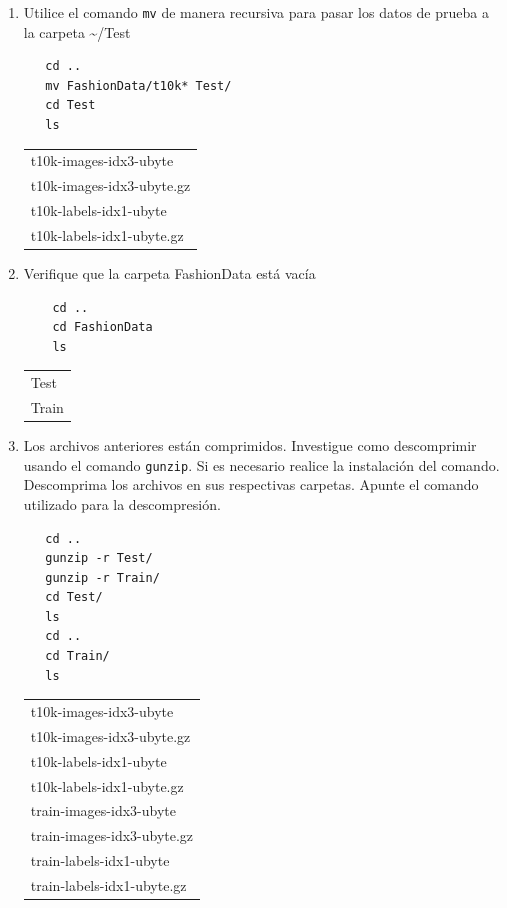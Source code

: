 \documentclass{article}
\begin{document}
\begin{enumerate}
\item Utilice el comando \texttt{mv} de manera recursiva para pasar los datos de
prueba a la carpeta \textasciitilde{}/Test
\begin{verbatim}
   cd ..
   mv FashionData/t10k* Test/
   cd Test
   ls

\end{verbatim}

\begin{table}[htbp]
\label{tab:orgbd0b6e0}
\centering
\begin{tabular}{l}
t10k-images-idx3-ubyte\\
t10k-images-idx3-ubyte.gz\\
t10k-labels-idx1-ubyte\\
t10k-labels-idx1-ubyte.gz\\
\end{tabular}
\end{table}

\item Verifique que la carpeta FashionData está vacía
\begin{verbatim}
    cd ..
    cd FashionData
    ls 
\end{verbatim}

\begin{table}[htbp]
\label{tab:org85ac1be}
\centering
\begin{tabular}{l}
Test\\
Train\\
\end{tabular}
\end{table}

\item Los archivos anteriores están comprimidos. Investigue como
descomprimir usando el comando \texttt{gunzip}. Si es necesario realice la
instalación del comando. Descomprima los archivos en sus
respectivas carpetas. Apunte el comando utilizado para la descompresión.
\begin{verbatim}
   cd ..
   gunzip -r Test/
   gunzip -r Train/
   cd Test/
   ls
   cd ..
   cd Train/
   ls

\end{verbatim}

\begin{table}[htbp]
\label{tab:org1d18902}
\centering
\begin{tabular}{l}
t10k-images-idx3-ubyte\\
t10k-images-idx3-ubyte.gz\\
t10k-labels-idx1-ubyte\\
t10k-labels-idx1-ubyte.gz\\
train-images-idx3-ubyte\\
train-images-idx3-ubyte.gz\\
train-labels-idx1-ubyte\\
train-labels-idx1-ubyte.gz\\
\end{tabular}
\end{table}


\end{enumerate}
\end{document}
